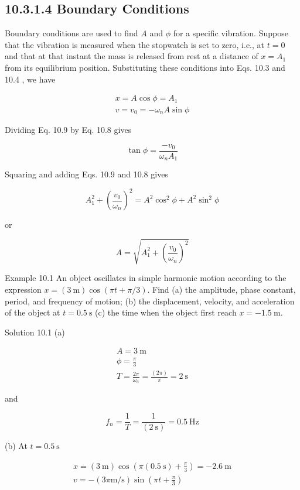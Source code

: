 \documentclass[10pt]{article}
\begin{document}
\subsection*{10.3.1.4 Boundary Conditions}
Boundary conditions are used to find $A$ and $\phi$ for a specific vibration. Suppose that the vibration is measured when the stopwatch is set to zero, i.e., at $t=0$ and that at that instant the mass is released from rest at a distance of $x=A_{1}$ from its equilibrium position. Substituting these conditions into Eqs. 10.3 and 10.4 , we have


\begin{gather*}
x=A \cos \phi=A_{1}  \tag{10.8}\\
v=v_{0}=-\omega_{n} A \sin \phi \tag{10.9}
\end{gather*}


Dividing Eq. 10.9 by Eq. 10.8 gives

$$
\tan \phi=\frac{-v_{0}}{\omega_{n} A_{1}}
$$

Squaring and adding Eqs. 10.9 and 10.8 gives

$$
A_{1}^{2}+\left(\frac{v_{0}}{\omega_{n}}\right)^{2}=A^{2} \cos ^{2} \phi+A^{2} \sin ^{2} \phi
$$

or

$$
A=\sqrt{A_{1}^{2}+\left(\frac{v_{0}}{\omega_{n}}\right)^{2}}
$$

Example 10.1 An object oscillates in simple harmonic motion according to the expression $x=(3 \mathrm{~m}) \cos (\pi t+\pi / 3)$. Find (a) the amplitude, phase constant, period, and frequency of motion; (b) the displacement, velocity, and acceleration of the object at $t=0.5 \mathrm{~s}$ (c) the time when the object first reach $x=-1.5 \mathrm{~m}$.

Solution 10.1 (a)

$$
\begin{gathered}
A=3 \mathrm{~m} \\
\phi=\frac{\pi}{3} \\
T=\frac{2 \pi}{\omega_{n}}=\frac{(2 \pi)}{\pi}=2 \mathrm{~s}
\end{gathered}
$$

and

$$
f_{n}=\frac{1}{T}=\frac{1}{(2 \mathrm{~s})}=0.5 \mathrm{~Hz}
$$

(b) At $t=0.5 \mathrm{~s}$

$$
\begin{gathered}
x=(3 \mathrm{~m}) \cos \left(\pi(0.5 \mathrm{~s})+\frac{\pi}{3}\right)=-2.6 \mathrm{~m} \\
v=-(3 \pi \mathrm{m} / \mathrm{s}) \sin \left(\pi t+\frac{\pi}{3}\right)
\end{gathered}
$$
\end{document}

